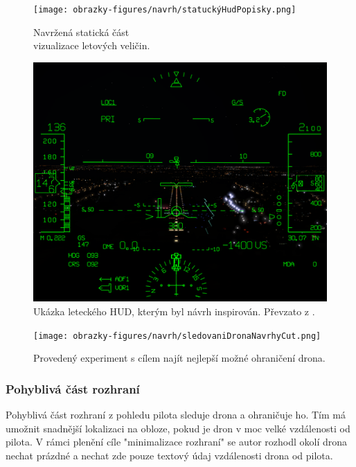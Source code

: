 \begin{figure}[h]
  \begin{minipage}{0.45\textwidth}
    \centering
    \texttt{[image: obrazky-figures/navrh/statuckýHudPopisky.png]}
    \caption{Navržená statická část\\ vizualizace letových veličin.} 
    \label{pic:graphicHudNavrh}
  \end{minipage}
  \hfill
  \begin{minipage}{0.55\textwidth}
    \centering
    \includegraphics[width=\textwidth]{obrazky-figures/navrh/AT-HUD-Product-Tile.png}
    \caption{Ukázka leteckého HUD, kterým byl návrh inspirován.  Převzato z \cite{hudPic}.} 
    \label{pic:HUDdisplay}
  \end{minipage}
\end{figure}

\begin{figure}[H]
    \centering
    \texttt{[image: obrazky-figures/navrh/sledovaniDronaNavrhyCut.png]}
    \caption{Provedený experiment s cílem najít nejlepší možné ohraničení drona.}
    \label{pic:experimentOhraniceni}
\end{figure}
\subsubsection{Pohyblivá část rozhraní}
Pohyblivá část rozhraní z pohledu pilota sleduje drona a ohraničuje ho. Tím má umožnit snadnější lokalizaci na obloze, pokud je dron v moc velké vzdálenosti od pilota. V rámci plenění cíle "minimalizace rozhraní" se autor rozhodl okolí drona nechat prázdné a nechat zde pouze textový údaj vzdálenosti drona od pilota.

